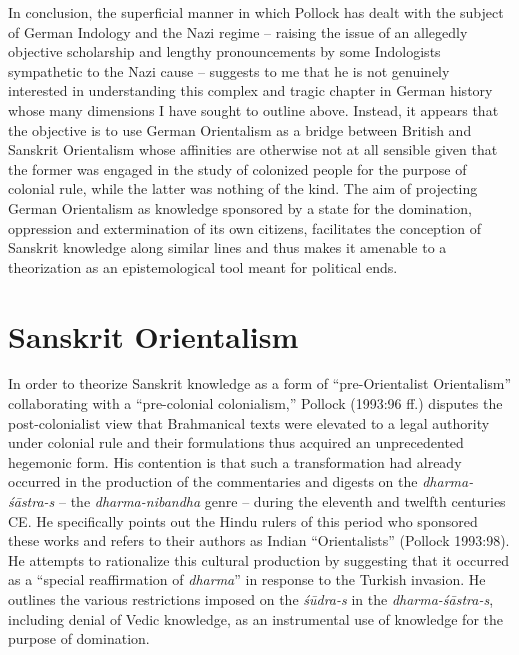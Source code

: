 In conclusion, the superficial manner in which Pollock has dealt with the subject of German Indology and the Nazi regime – raising the issue of an allegedly objective scholarship and lengthy pronouncements by some Indologists sympathetic to the Nazi cause – suggests to me that he is not genuinely interested in understanding this complex and tragic chapter in German history whose many dimensions I have sought to outline above. Instead, it appears that the objective is to use German Orientalism as a bridge between British and Sanskrit Orientalism whose affinities are otherwise not at all sensible given that the former was engaged in the study of colonized people for the purpose of colonial rule, while the latter was nothing of the kind. The aim of projecting German Orientalism as knowledge sponsored by a state for the domination, oppression and extermination of its own citizens, facilitates the conception of Sanskrit knowledge along similar lines and thus makes it amenable to a theorization as an epistemological tool meant for political ends.

\section*{Sanskrit Orientalism}

In order to theorize Sanskrit knowledge as a form of “pre-Orientalist Orientalism” collaborating with a “pre-colonial colonialism,” Pollock (1993:96 ff.) disputes the post-colonialist view that Brahmanical texts were elevated to a legal authority under colonial rule and their formulations thus acquired an unprecedented hegemonic form. His contention is that such a transformation had already occurred in the production of the commentaries and digests on the {\sl dharma-śāstra-s} – the {\sl dharma-nibandha} genre – during the eleventh and twelfth centuries CE\@. He specifically points out the Hindu rulers of this period who sponsored these works and refers to their authors as Indian “Orientalists” (Pollock 1993:98). He attempts to rationalize this cultural production by suggesting that it occurred as a “special reaffirmation of {\sl dharma}” in response to the Turkish invasion. He outlines the various restrictions imposed on the {\sl śūdra-s} in the {\sl dharma-śāstra-s}, including denial of Vedic knowledge, as an instrumental use of knowledge for the purpose of domination.
\newpage

